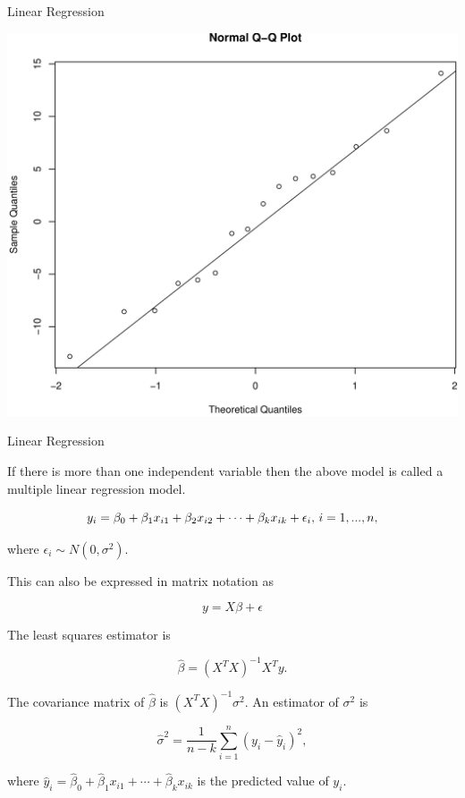 \documentclass[9pt,ignorenonframetext,]{beamer}
\newenvironment{Shaded}{\begin{snugshade}}{\end{snugshade}}
\newcommand{\KeywordTok}[1]{\textcolor[rgb]{0.13,0.29,0.53}{\textbf{{#1}}}}
\newcommand{\CommentTok}[1]{\textcolor[rgb]{0.56,0.35,0.01}{\textit{{#1}}}}
\newcommand{\NormalTok}[1]{{#1}}
\begin{document}
\begin{frame}[fragile]{Linear Regression}

\begin{Shaded}
\end{Shaded}

\includegraphics{class2-jan11_files/figure-beamer/unnamed-chunk-19-1.pdf}

\end{frame}

\begin{frame}{Linear Regression}

If there is more than one independent variable then the above model is
called a multiple linear regression model.

\[ y_i=\beta_0+\beta_1 x_{i1} + \beta_2 x_{i2} + \cdots +  \beta_k x_{ik} + \epsilon_{i}, \thinspace i=1,...,n, \]

where \(\epsilon_{i} \sim N(0,\sigma^2)\).

This can also be expressed in matrix notation as

\[ y=X\beta+\epsilon\]

The least squares estimator is

\[{\hat \beta}=\left(X^{T} X\right)^{-1}X^{T}y.\]

The covariance matrix of \({\hat \beta}\) is
\(\left(X^{T} X\right)^{-1}{\sigma}^2\). An estimator of \(\sigma^2\) is

\[{\hat \sigma^2}=\frac{1}{n-k}\sum_{i=1}^{n}(y_i-{\hat y_i})^2,\]

where
\({\hat y_i}={\hat \beta_0}+{\hat \beta_1} x_{i1} + \cdots + {\hat \beta_k} x_{ik}\)
is the predicted value of \(y_i\).

\end{frame}
\end{document}
